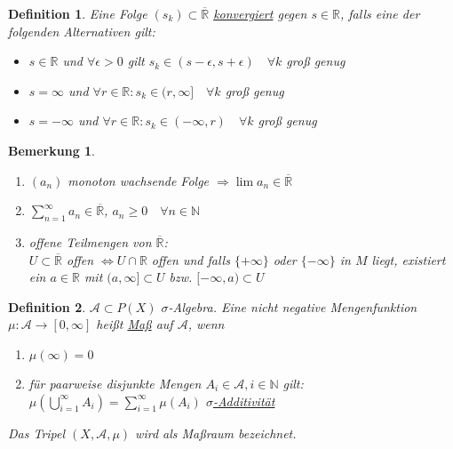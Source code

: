\documentclass[11pt]{memoir}
\theoremstyle{changebreak}
\newtheorem{Definition}{Definition}[chapter]
\newtheorem{Bemerkung}{Bemerkung}[chapter]
\begin{document}
\begin{Definition}
Eine Folge $(s_{k}) \subset \overline{\mathbb{R}}$ \underline{konvergiert} gegen $s \in \mathbb{R}$, falls eine der folgenden Alternativen gilt:
\begin{itemize}
	\item  $s \in \mathbb{R}$ und $\forall \epsilon > 0$ gilt $s_{k} \in (s-\epsilon, s+\epsilon) \quad\forall k$ groß genug
	\item $s = \infty$ und $\forall r \in \mathbb{R}: s_{k} \in (r, \infty] \quad \forall k$ groß genug
	\item $s = -\infty$ und $\forall r \in \mathbb{R}: s_k \in (-\infty, r) \quad \forall k$ groß genug
\end{itemize}
\end{Definition}

\begin{Bemerkung}
\begin{enumerate}
	\item $(a_n)$ monoton wachsende Folge
	$\Rightarrow \lim a_n \in \mathbb{\overline{R}}$
	\item $\sum\limits_{n=1}^{\infty} a_n \in \mathbb{\overline{R}}$, $a_n \geq 0 \quad \forall n \in \mathbb{N}$
	\item offene Teilmengen von $\overline{\mathbb{R}}$: \\
	$U \subset \overline{\mathbb{R}} $ offen $\Leftrightarrow U \cap \mathbb{R}$ offen und falls $\{+\infty\}$ oder $\{-\infty\}$ in $M$ liegt, existiert ein $a \in \mathbb{R}$ mit $(a,{} \infty ]\subset U$ bzw. $[-\infty, a) \subset U$
\end{enumerate}
\end{Bemerkung}

\begin{Definition}
$\mathscr{A} \subset P(X)$ $\sigma$-Algebra. Eine nicht negative Mengenfunktion $\mu: \mathscr{A} \rightarrow [0, \infty]$ heißt \underline{Maß} auf $\mathscr{A}$, wenn
\begin{enumerate}
	\item $\mu(\infty) = 0$
	\item für paarweise disjunkte Mengen $A_i \in \mathscr{A}, i \in \mathbb{N}$ gilt: \\
	$\mu(\bigcup\limits_{i=1}^{\infty}A_i) = \sum\limits_{i=1}^{\infty} \mu(A_i)$ \underline{$\sigma$-Additivität}
\end{enumerate}
Das Tripel $(X, \mathscr{A}, \mu)$ wird als Maßraum bezeichnet.
\end{Definition}
\end{document}
